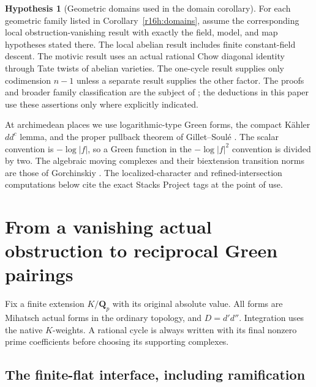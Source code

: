 \documentclass[11pt,a4paper]{article}
\theoremstyle{definition}
\newtheorem{hypothesis}[theorem]{Hypothesis}
\theoremstyle{remark}
\numberwithin{equation}{section}
\begin{document}
\begin{hypothesis}[Geometric domains used in the domain corollary]\label{hyp:height-geometric}
For each geometric family listed in Corollary~\ref{r16h:domains}, assume the corresponding local obstruction-vanishing result with exactly the field, model, and map hypotheses stated there. The local abelian result includes finite constant-field descent. The motivic result uses an actual rational Chow diagonal identity through Tate twists of abelian varieties. The one-cycle result supplies only codimension $n-1$ unless a separate result supplies the other factor. The proofs and broader family classification are the subject of \cite{SC}; the deductions in this paper use these assertions only where explicitly indicated.
\end{hypothesis}

At archimedean places we use logarithmic-type Green forms, the compact K\"ahler $dd^c$ lemma, and the proper pullback theorem of Gillet--Soul\'e \cite[Sections 1.2--1.3 and Theorem 2.1.4(ii)]{GS}. The scalar convention is $-\log|f|$, so a Green function in the $-\log|f|^2$ convention is divided by two. The algebraic moving complexes and their biextension transition norms are those of Gorchinskiy \cite[Lemma 2.1, Section 4.1 and Proposition 4.2]{Gor}. The localized-character and refined-intersection computations below cite the exact Stacks Project tags at the point of use.



\section{From a vanishing actual obstruction to reciprocal Green pairings}
\label{r16h:section}

Fix a finite extension $K/\mathbf Q_p$ with its original absolute value.
All forms are Mihatsch actual forms in the ordinary topology, and
$D=d'd''$. Integration uses the native $K$-weights. A rational cycle is
always written with its final nonzero prime coefficients before choosing
its supporting complexes.

\subsection{The finite-flat interface, including ramification}
\end{document}
